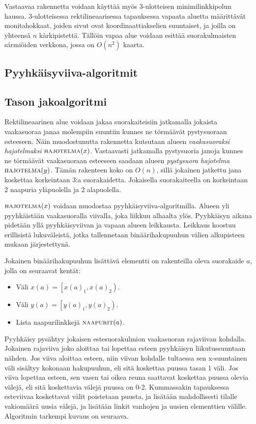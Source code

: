\documentclass[finnish]{tktltiki2}
\theoremstyle{definition}
\theoremstyle{remark}
\newcommand\range[2]{\ensuremath{\left [ #1 , #2 \right )}\xspace}
\newcommand\xrange[1]{\ensuremath{x(#1)}\xspace}
\newcommand\yrange[1]{\ensuremath{y(#1)}\xspace}
\newcommand\xranget[2]{\ensuremath{x(#1)_{#2}}\xspace}
\newcommand\yranget[2]{\ensuremath{y(#1)_{#2}}\xspace}
\newcommand\nbs[1]{\ensuremath{\textsc{naapurit}{(#1)}}\xspace}
\newcommand\decomp[1]{\ensuremath{\textsc{hajotelma}(#1)}\xspace}
\begin{document}
Vastaavaa rakennetta voidaan käyttää myös 3-ulotteisen minimilinkkipolun haussa.
3-ulotteisessa rektilineaarisessa tapauksessa vapaata aluetta määrittävät monitahokkaat, joiden sivut ovat koordinaattiakselien suuntaiset, ja joilla on yhteensä $n$ kärkipistettä.
Tällöin vapaa alue voidaan esittää suorakulmaisten särmiöiden verkkona, jossa on $O(n^2)$ kaarta.

\subsection{Pyyhkäisyviiva-algoritmit}\label{sec:sweep}

\subsection{Tason jakoalgoritmi}\label{sec:jako2d}

Rektilineaarinen alue voidaan jakaa suorakaiteisiin jatkamalla jokaista vaakasuoraa janaa molempiin suuntiin kunnes ne törmäävät pystysuoraan esteeseen.
Näin muodostunutta rakennetta kutsutaan alueen \emph{vaakasuoraksi hajotelmaksi} \decomp{x}.
Vastaavasti jatkamalla pystysuoria janoja kunnes ne törmäävät vaakasuoraan esteeseen saadaan alueen \emph{pystysuora hajotelma} \decomp{y}.
Tämän rakenteen koko on $O(n)$, sillä jokainen jatkettu jana koskettaa korkeintaan 3:a suorakaidetta.
Jokaisella suorakaiteella on korkeintaan 2 naapuria yläpuolella ja 2 alapuolella.

\decomp{x} voidaan muodostaa pyyhkäisyviiva-algoritmilla.
Alueen yli pyyhkäistään vaakasuoralla viivalla, joka liikkuu alhaalta ylös.
Pyyhkäisyn aikana pidetään yllä pyyhkäisyviivan ja vapaan alueen leikkausta.
Leikkaus koostuu erillisistä lukuväleistä, jotka tallennetaan binäärihakupuuhun välien alkupisteen mukaan järjestettynä.

Jokainen binäärihakupuuhun lisättävä elementti on rakenteilla oleva suorakaide $a$, jolla on seuraavat kentät:
\begin{itemize}
\item Väli $\xrange{a}=\range{\xranget{a}{1}}{\xranget{a}{2}}$.
\item Väli $\yrange{a}=\range{\yranget{a}{1}}{\yranget{a}{2}}$.
\item Lista naapurilinkkejä $\nbs{a}$.
\end{itemize}

Pyyhkäisy pysähtyy jokaisen estesuorakulmion vaakasuoran rajaviivan kohdalla.
Jokainen rajaviiva joko aloittaa tai lopettaa esteen pyyhkäisyn liikutussuuntaan nähden.
Jos viiva aloittaa esteen, niin viivan kohdalle tultaessa sen x-suuntainen väli sisältyy kokonaan hakupuuhun, eli sitä koskettaa puussa tasan 1 väli.
Jos viiva lopettaa esteen, sen vasen tai oikea reuna saattavat koskettaa puussa olevia välejä, eli sitä koskettavia välejä puussa on 0-2.
Kummassakin tapauksessa esteviivaa koskettavat välit poistetaan puusta, ja lisätään mahdollisesti tilalle vakiomäärä uusia välejä, ja lisätään linkit vanhojen ja uusien elementtien välille.
Algoritmin tarkempi kuvaus on seuraava.
\end{document}
